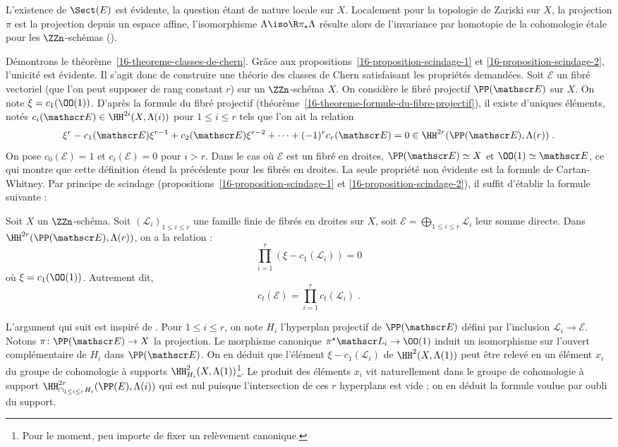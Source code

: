 \documentclass[10pt]{../fichiers-configuration-latex/smfart}
\begin{document}
L'existence de $\Sect(E)$ est évidente, la question étant de
nature locale sur $X$. Localement pour la topologie de Zariski sur $X$, la
projection $\pi$ est la projection depuis un espace affine, l'isomorphisme
$\Lambda\iso \R\pi_\star\Lambda$ résulte alors de l'invariance par
homotopie de la cohomologie étale pour les $\ZZn$-schémas ().

\medskip

Démontrons le théorème~\ref{16-theoreme-classes-de-chern}. Grâce aux
propositions~\ref{16-proposition-scindage-1} et
\ref{16-proposition-scindage-2}, l'unicité est évidente. Il s'agit donc de
construire une théorie des classes de Chern satisfaisant les propriétés
demandées. Soit $\mathscr E$ un fibré vectoriel (que l'on peut
supposer de rang constant $r$) sur un $\ZZn$-schéma $X$. On considère le
fibré projectif $\PP(\mathscr E)$ sur $X$.
On note $\xi=c_1(\OO(1))$. D'après la
formule du fibré projectif
(théorème~\ref{16-theoreme-formule-du-fibre-projectif}), il existe d'uniques éléments, notés
$c_i(\mathscr E)\in \HH^{2i}(X,\Lambda(i))$ pour $1\leq i\leq r$ tels 
que l'on ait la
relation
\[\xi^r - c_1(\mathscr E)\xi^{r-1}+c_2(\mathscr E)\xi^{r-2}
+\dots+(-1)^r c_r(\mathscr E)=0\in
\HH^{2r}(\PP(\mathscr E),\Lambda(r))\;\text{.}\]
On pose $c_0(\mathscr E)=1$ et $c_i(\mathscr E)=0$ pour $i>r$.
Dans le cas où $\mathscr E$ est un
fibré en droites, $\PP(\mathscr E)\simeq X$
et $\OO(1)\simeq \mathscr E$, ce qui 
montre que cette définition étend la précédente pour les fibrés en droites.
La seule propriété non évidente est la formule de
Cartan-Whitney. Par principe de scindage
(propositions~\ref{16-proposition-scindage-1} et \ref{16-proposition-scindage-2}),
il suffit d'établir la formule
suivante :

\begin{lemme}
Soit $X$ un $\ZZn$-schéma. Soit $(\mathscr L_i)_{1\leq i\leq r}$ 
une famille finie
de fibrés en droites sur $X$, soit $\mathscr E=\bigoplus_{1\leq i\leq r}
\mathscr L_i$ leur
somme directe. Dans $\HH^{2r}(\PP(\mathscr E),\Lambda(r))$, on a la relation :
\[\prod_{i=1}^r(\xi-c_1(\mathscr L_i))=0\]
où $\xi=c_1(\OO(1))$. Autrement dit, 
\[c_t(\mathscr E)=\prod_{i=1}^r c_t(\mathscr L_i)\;\text{.}\]
\end{lemme}

L'argument qui suit est inspiré de \cite{PF@Panin-Smyrnov}. 
Pour $1\leq i\leq r$, on note $H_i$ l'hyperplan projectif de $\PP(\mathscr E)$
défini par l'inclusion $\mathscr L_i\to \mathscr E$. Notons $\pi\colon
\PP(\mathscr E)\to X$ la projection. Le morphisme canonique
$\pi^\star\mathscr L_i\to \OO(1)$ induit un isomorphisme sur l'ouvert
complémentaire de $H_i$ dans $\PP(\mathscr E)$.
On en déduit que l'élément $\xi-c_1(\mathscr L_i)$
de $\HH^2(X,\Lambda(1))$ peut être relevé en un élément $x_i$ du groupe de 
cohomologie à supports $\HH^2_{H_i}(X,\Lambda(1))$\;\footnote{Pour 
le moment,
peu importe de fixer un relèvement canonique.}.
Le produit des éléments $x_i$ vit naturellement dans le
groupe de cohomologie à support
$\HH^{2r}_{\cap_{1\leq i \leq r} H_i}(\PP(E),\Lambda(i))$ qui est nul puisque
l'intersection de ces $r$ hyperplans est vide ; on en
déduit la formule voulue par oubli du support.
\end{document}
